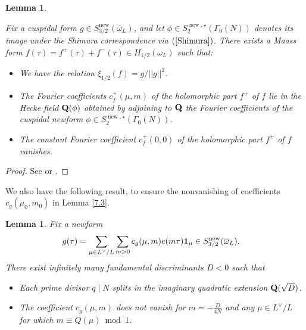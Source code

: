\documentclass{amsart}
\newtheorem{lemma}[theorem]{Lemma}
\theoremstyle{definition}
\theoremstyle{definition}
\theoremstyle{definition}
\begin{document}
\begin{lemma}\label{7.4} 

Fix a cuspidal form $g \in S_{3/2}^{\operatorname{new}}(\overline{\omega}_L)$,
and let $\phi \in S_2^{\operatorname{new}, \star}(\Gamma_0(N))$ denotes its image under the Shimura correspondence via $(\ref{Shimura})$. 
There exists a Maass form $f(\tau) = f^+(\tau) + f^-(\tau) \in H_{1/2}(\omega_L)$ such that: \\

\begin{itemize}

\item[(i)] We have the relation $\xi_{1/2}(f) = g / \vert \vert g \vert \vert^2$. \\

\item[(ii)] The Fourier coefficients $c_f^+(\mu, m)$ of the holomorphic part $f^+$ of $f$ lie in the Hecke field ${\bf{Q}}(\phi)$ obtained by adjoining to ${\bf{Q}}$
the Fourier coefficients of the cuspidal newform $\phi \in S_2^{\operatorname{new}, \star}(\Gamma_0(N))$. \\

\item[(iii)] The constant Fourier coefficient $c_f^+(0, 0)$ of the holomorphic part $f^+$ of $f$ vanishes. \\

\end{itemize}

\end{lemma}

\begin{proof} See \cite[Lemma 7.4]{BY} or \cite[Lemma 7.3]{BO}.  \end{proof}

We also have the following result, to ensure the nonvanishing of coefficients $c_g(\mu_0, m_0)$ in Lemma \ref{7.3}. 

\begin{lemma}\label{7.5} Fix a newform
\begin{align*} g(\tau) 
&= \sum\limits_{\mu \in L^{\vee}/L} \sum\limits_{m >0} c_g(\mu, m) e(m \tau) {\bf{1}}_{\mu} \in S_{3/2}^{\operatorname{new}}(\overline{\omega}_L). \end{align*}
There exist infinitely many fundamental discriminants $D< 0$ such that  

\begin{itemize}

\item[(i)] Each prime divisor $q \mid N$ splits in the imaginary quadratic extension ${\bf{Q}}(\sqrt{D})$. 

\item[(ii)] The coefficient $c_g(\mu, m)$ does not vanish for $m = - \frac{D}{4N}$ and any $\mu \in L^{\vee}/L$ for which $m \equiv Q(\mu) \bmod 1$. 
 
\end{itemize}
\end{lemma}
\end{document}
